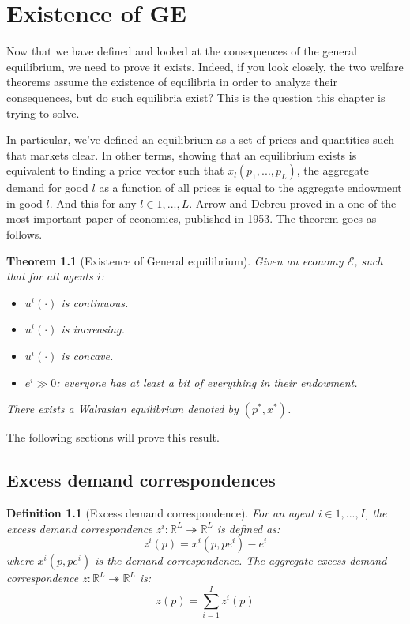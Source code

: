 \documentclass[12pt]{report}
\newtheorem{theorem}{Theorem}[chapter]
\newtheorem{definition}{Definition}[chapter]
\begin{document}
\chapter{Existence of GE}

Now that we have defined and looked at the consequences of the general equilibrium, we need to prove it exists. Indeed, if you look closely, the two welfare theorems assume the existence of equilibria in order to analyze their consequences, but do such equilibria exist? This is the question this chapter is trying to solve.

In particular, we've defined an equilibrium as a set of prices and quantities such that markets clear. In other terms, showing that an equilibrium exists is equivalent to finding a price vector such that $x_l(p_1, ...,p_L)$, the aggregate demand for good $l$ as a function of all prices is equal to the aggregate endowment in good $l$. And this for any $l\in 1, ..., L$. Arrow and Debreu proved in a one of the most important paper of economics, published in 1953. The theorem goes as follows.

\begin{theorem}[Existence of General equilibrium]
Given an economy $\mathcal{E}$, such that for all agents $i$:\begin{itemize}
\item $u^i(\cdot)$ is continuous.
\item $u^i(\cdot)$ is increasing.
\item $u^i(\cdot)$ is concave.
\item $e^i \gg 0$: everyone has at least a bit of everything in their endowment.
\end{itemize}
There exists a Walrasian equilibrium denoted by $(p^*, x^*)$.
\end{theorem}

The following sections will prove this result.

\section{Excess demand correspondences}

\begin{definition}[Excess demand correspondence]
For an agent $i\in 1, ..., I$, the excess demand correspondence $z^i:\mathbb{R}^L\twoheadrightarrow  \mathbb{R}^L$ is defined as: $$z^i(p) = x^i(p, pe^i) - e^i $$ where $x^i(p, pe^i)$ is the demand correspondence. The aggregate excess demand correspondence $z:\mathbb{R}^L\twoheadrightarrow  \mathbb{R}^L$ is: $$ z(p) = \sum_{i=1}^{I}z^i(p)$$
\end{definition}
\end{document}

